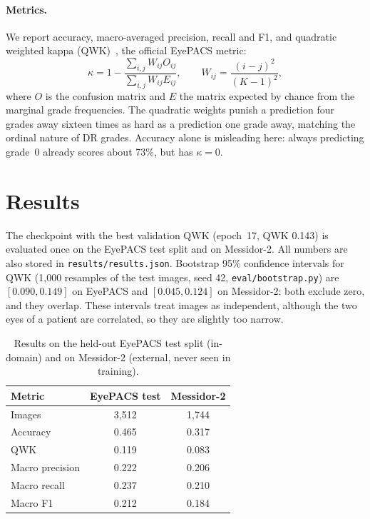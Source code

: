 \documentclass[11pt,a4paper]{article}
\begin{document}
\paragraph{Metrics.} We report accuracy, macro-averaged precision, recall and F1, and
quadratic weighted kappa (QWK)~\cite{cohen1968weighted}, the official EyePACS
metric:
\[
  \kappa = 1 - \frac{\sum_{i,j} W_{ij} O_{ij}}{\sum_{i,j} W_{ij} E_{ij}},\qquad
  W_{ij} = \frac{(i-j)^2}{(K-1)^2},
\]
where $O$ is the confusion matrix and $E$ the matrix expected by chance from the
marginal grade frequencies. The quadratic weights punish a prediction four grades
away sixteen times as hard as a prediction one grade away, matching the ordinal
nature of DR grades. Accuracy alone is misleading here: always predicting grade~0
already scores about 73\%, but has $\kappa=0$.

\section{Results}

The checkpoint with the best validation QWK (epoch~17, QWK 0.143) is evaluated once
on the EyePACS test split and on Messidor-2. All numbers are also stored in
\texttt{results/results.json}. Bootstrap 95\% confidence intervals for QWK (1,000
resamples of the test images, seed 42, \texttt{eval/bootstrap.py}) are
$[0.090, 0.149]$ on EyePACS and $[0.045, 0.124]$ on Messidor-2: both exclude zero,
and they overlap. These intervals treat images as independent, although the two
eyes of a patient are correlated, so they are slightly too narrow.

\begin{table}[!htbp]
\centering
\caption{Results on the held-out EyePACS test split (in-domain) and on Messidor-2
(external, never seen in training).}
\label{tab:results}
\begin{tabular}{lcc}
\toprule
Metric & EyePACS test & Messidor-2 \\
\midrule
Images           & 3,512 & 1,744 \\
Accuracy         & 0.465 & 0.317 \\
QWK              & 0.119 & 0.083 \\
Macro precision  & 0.222 & 0.206 \\
Macro recall     & 0.237 & 0.210 \\
Macro F1         & 0.212 & 0.184 \\
\bottomrule
\end{tabular}
\end{table}
\end{document}
